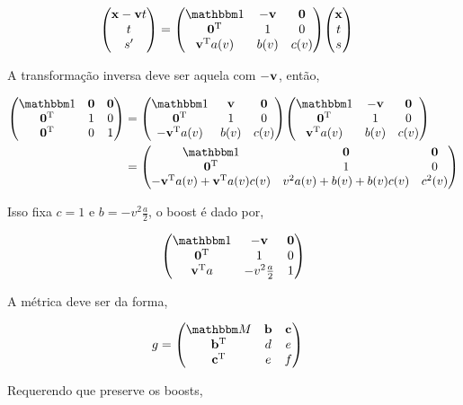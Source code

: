 \documentclass[twoside]{amsart}
\numberwithin{equation}{section}
\begin{document}
\begin{align}
    \mqty(\vb x-\vb v t\\t\\ s')&=\mqty(\mathbbm 1&-\vb v&\vb 0\\ \vb 0^{\textup T }&1&0\\\vb v^{\textup T}a\qty(v)&b\qty(v)&c\qty(v))\mqty(\vb x\\ t\\ s)
\end{align}

A transformação inversa deve ser aquela com $-\vb v$, então,

\begin{align}
    \mqty(\mathbbm 1&\vb 0&\vb 0\\\vb 0^{\textup T}&1&0\\\vb 0^{\textup T}&0&1)&=\mqty(\mathbbm 1&\vb v&\vb 0\\ \vb 0^{\textup T }&1&0\\-\vb v^{\textup T}a\qty(v)&b\qty(v)&c\qty(v))\mqty(\mathbbm 1&-\vb v&\vb 0\\ \vb 0^{\textup T }&1&0\\\vb v^{\textup T}a\qty(v)&b\qty(v)&c\qty(v))\\
    &=\mqty(\mathbbm 1&\vb 0&\vb 0\\ \vb 0^{\textup T }&1&0\\-\vb v^{\textup T}a\qty(v)+\vb v^{\textup T}a\qty(v)c\qty(v)&v^2a\qty(v)+b\qty(v)+b\qty(v)c\qty(v)&c^2\qty(v))
\end{align}

Isso fixa $c=1$ e $b=-v^2\frac a2$, o boost é dado por,

\begin{align}
    \mqty(\mathbbm 1&-\vb v&\vb 0\\ \vb 0^{\textup T }&1&0\\\vb v^{\textup T}a&-v^2\frac a2&1)
\end{align}

A métrica deve ser da forma,

\begin{align}
    g&=\mqty(\mathbbm M&\vb b&\vb c\\\vb b^{\textup T}&d&e\\\vb c^{\textup T}&e&f)
\end{align}

Requerendo que preserve os boosts,
\end{document}
